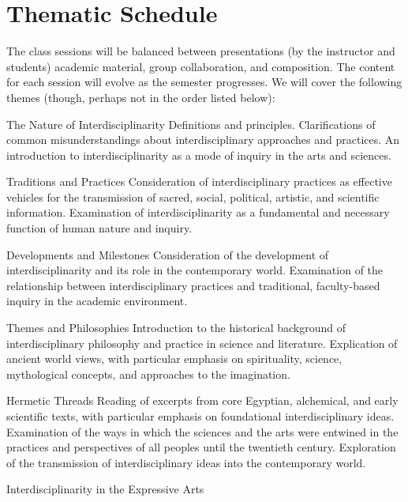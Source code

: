 \documentclass[letterpaper,10pt,headsepline]{scrreprt}
\begin{document}
\section{Thematic Schedule}
The class sessions will be balanced between presentations (by the instructor and students) academic material, group collaboration, and composition. The content for each session will evolve as the semester progresses. We will cover the following themes (though, perhaps not in the order listed below):
\\
\begin{compactdesc}

\item[The Nature of Interdisciplinarity]
Definitions and principles.
Clarifications of common misunderstandings about interdisciplinary approaches and practices.
An introduction to interdisciplinarity as a mode of inquiry in the arts and sciences.
\\
\item[Traditions and Practices]
Consideration of interdisciplinary practices as effective vehicles for the transmission of  sacred, social, political, artistic, and scientific information.
Examination of interdisciplinarity as a fundamental and necessary function of human nature and inquiry.
\\
\item[Developments and Milestones]
Consideration of the development of interdisciplinarity and its role in the contemporary world.
Examination of the relationship between interdisciplinary practices and traditional, faculty-based inquiry in the academic environment.
\\
\item[Themes and Philosophies]
Introduction to the historical background of interdisciplinary philosophy and practice in science and literature.
Explication of ancient world views, with particular emphasis on spirituality, science, mythological concepts, and approaches to the imagination.
\\
\item[Hermetic Threads]
Reading of excerpts from core Egyptian, alchemical, and early scientific texts, with particular emphasis on foundational interdisciplinary ideas.
Examination of the ways in which the sciences and the arts were entwined in the practices and perspectives of all peoples until the twentieth century.
Exploration of the transmission of interdisciplinary ideas into the contemporary world.
\\
\item[Interdisciplinarity in the Expressive Arts]

\end{compactdesc}
\end{document}
